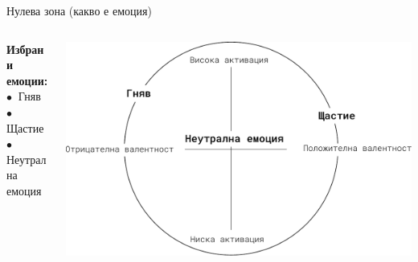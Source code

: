 \documentclass[9pt]{beamer}
\begin{document}
    \begin{frame}{Нулева зона (какво е емоция)}
        \begin{columns}[T] %
            \begin{column}{.38\textwidth}
                \textbf{Избрани емоции:}
                \vspace{1cm}\\
                $\bullet\ $ Гняв
                \vspace{1cm}\\
                $\bullet\ $ Щастие
                \vspace{1cm}\\
                $\bullet\ $ Неутрална емоция
                \vspace{1cm}\\
                \phantom{$\bullet\ $ Тъга}
            \end{column}%
            \hfill%
            \begin{column}{.60\textwidth}
                \vspace{1cm}
                \begin{center}
                    \includegraphics[width=\textwidth]{valence_arousal_ahn}%
                \end{center}
            \end{column}%
        \end{columns}
    \end{frame}
\end{document}
